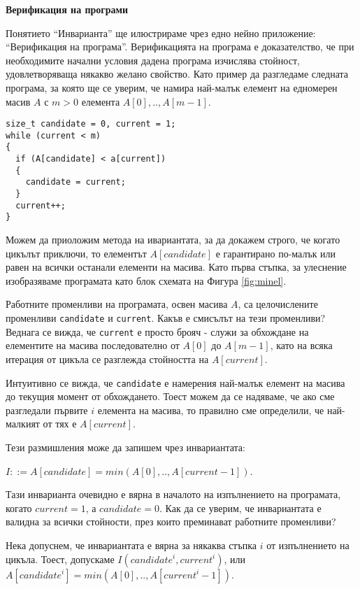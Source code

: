 \documentclass[12pt,a4paper]{article}
\newcommand{\code}[1]{\texttt{#1}}
\begin{document}
\begin{mdframed}[hidealllines=true,backgroundcolor=gray!20]

\bigskip
\textbf{Верификация на програми}
\bigskip

Понятието ``Инварианта'' ще илюстрираме чрез едно нейно приложение: ``Верификация на програма''. Верификацията на програма е доказателство, че при необходимите начални условия дадена програма изчислява стойност, удовлетворяваща някакво желано свойство. Като пример да разгледаме следната  програма, за която ще се уверим, че намира най-малък елемент на едномерен масив $A$ с $m>0$ елемента $A[0],..,A[m-1]$.


\begin{verbatim}
size_t candidate = 0, current = 1;
while (current < m)
{
  if (A[candidate] < a[current])
  {
    candidate = current;
  }
  current++;
}
\end{verbatim}
Можем да приоложим метода на ивариантата, за да докажем строго, че когато цикълът приключи, то елементът $A[candidate]$ е гарантирано по-малък или равен на всички останали елементи на масива.
Като първа стъпка, за улеснение изобразяваме програмата като блок схемата на Фигура \ref{fig:minel}.


Работните променливи на програмата, освен масива $A$, са целочислените променливи \code{candidate} и \code{current}. Какъв е смисълът на тези променливи? Веднага се вижда, че \code{current} е просто брояч - служи за обхождане на елементите на масива последователно от $A[0]$ до $A[m-1]$, като на всяка итерация от цикъла се разглежда стойността на $A[current]$.

Интуитивно се вижда, че \code{candidate} е намерения най-малък елемент на масива до текущия момент от обхождането. Тоест можем да се надяваме, че ако сме разгледали първите $i$ елемента на масива, то правилно сме определили, че най-малкият от тях е $A[current]$.

Тези размишления може да запишем чрез инвариантата:

$I ::= A[candidate]=min(A[0],..,A[current-1])$.

Тази инварианта очевидно е вярна в началото на изпълнението на програмата, когато $current=1$, а $candidate=0$. Как да се уверим, че инвариантата е валидна за всички стойности, през които преминават работните променливи?

Нека допуснем, че инвариантата е вярна за някаква стъпка $i$ от изпълнението на цикъла. Тоест, допускаме $I(candidate^i, current^i)$, или $A[candidate^i]=min(A[0],..,A[current^i-1])$.


\end{mdframed}
\end{document}
